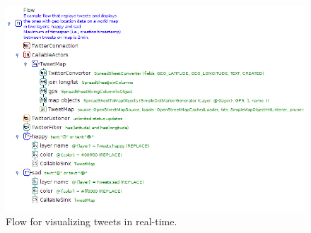 \documentclass[a4paper,10pt]{book}
\begin{document}
\begin{figure}[htb]
  \centering
  \includegraphics[width=12.0cm]{images/visualize_tweets-realtime-flow.png}
  \caption{Flow for visualizing tweets in real-time.}
  \label{visualize_tweets-realtime-flow}
\end{figure}
\end{document}
